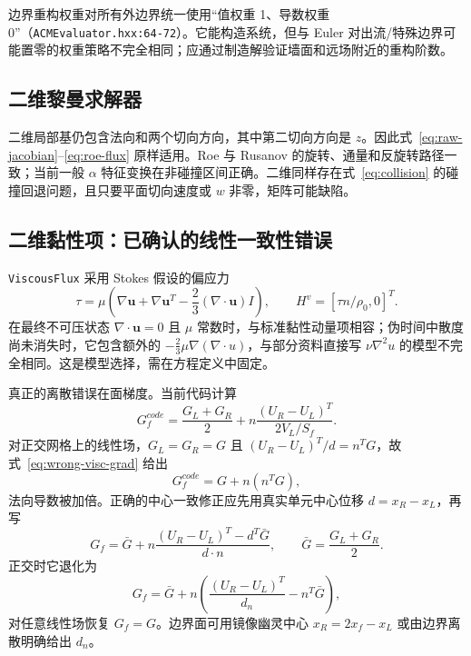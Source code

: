 \documentclass[UTF8,11pt,a4paper]{ctexart}
\newcommand{\code}[1]{\nolinkurl{#1}}
\begin{document}
边界重构权重对所有外边界统一使用“值权重 1、导数权重 0”（\code{ACMEvaluator.hxx:64-72}）。它能构造系统，但与 Euler 对出流/特殊边界可能置零的权重策略不完全相同；应通过制造解验证墙面和远场附近的重构阶数。

\subsection{二维黎曼求解器}

二维局部基仍包含法向和两个切向方向，其中第二切向方向是 $z$。因此式~\eqref{eq:raw-jacobian}--\eqref{eq:roe-flux} 原样适用。Roe 与 Rusanov 的旋转、通量和反旋转路径一致；当前一般 $\alpha$ 特征变换在非碰撞区间正确。二维同样存在式~\eqref{eq:collision} 的碰撞回退问题，且只要平面切向速度或 $w$ 非零，矩阵可能缺陷。

\subsection{二维黏性项：已确认的线性一致性错误}

\code{ViscousFlux} 采用 Stokes 假设的偏应力
\begin{equation}
 \tau=\mu\left(\nabla\bm u+\nabla\bm u^T-\frac23(\nabla\cdot\bm u)I\right),
 \qquad H^v=[\tau n/\rho_0,0]^T.
 \label{eq:stress}
\end{equation}
在最终不可压状态 $\nabla\cdot\bm u=0$ 且 $\mu$ 常数时，与标准黏性动量项相容；伪时间中散度尚未消失时，它包含额外的 $-\tfrac23\mu\nabla(\nabla\cdot u)$，与部分资料直接写 $\nu\nabla^2u$ 的模型不完全相同。这是模型选择，需在方程定义中固定。

真正的离散错误在面梯度。当前代码计算
\begin{equation}
 G_f^{code}=\frac{G_L+G_R}{2}+n\frac{(U_R-U_L)^T}{2V_L/S_f}.
 \label{eq:wrong-visc-grad}
\end{equation}
对正交网格上的线性场，$G_L=G_R=G$ 且 $(U_R-U_L)^T/d=n^TG$，故式~\eqref{eq:wrong-visc-grad} 给出
\begin{equation}
 G_f^{code}=G+n(n^TG),
\end{equation}
法向导数被加倍。正确的中心一致修正应先用真实单元中心位移 $d=x_R-x_L$，再写
\begin{equation}
 G_f=\bar G+n\frac{(U_R-U_L)^T-d^T\bar G}{d\cdot n},
 \qquad \bar G=\frac{G_L+G_R}{2}.
 \label{eq:correct-visc-grad}
\end{equation}
正交时它退化为
\begin{equation}
 G_f=\bar G+n\left(\frac{(U_R-U_L)^T}{d_n}-n^T\bar G\right),
\end{equation}
对任意线性场恢复 $G_f=G$。边界面可用镜像幽灵中心 $x_R=2x_f-x_L$ 或由边界离散明确给出 $d_n$。
\end{document}
